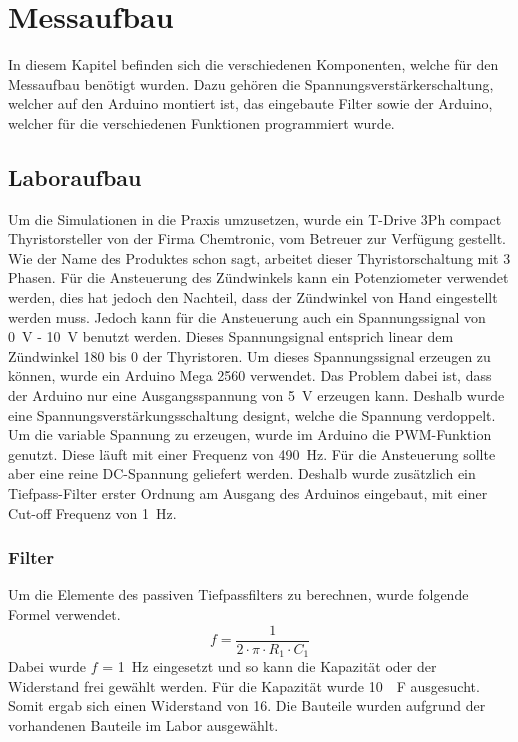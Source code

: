 \section{Messaufbau}
In diesem Kapitel befinden sich die verschiedenen Komponenten, welche für den Messaufbau benötigt wurden. Dazu gehören die Spannungsverstärkerschaltung, welcher auf den Arduino montiert ist, das eingebaute Filter sowie der Arduino, welcher für die verschiedenen Funktionen programmiert wurde.
\subsection{Laboraufbau}
Um die Simulationen in die Praxis umzusetzen, wurde ein \grqq T-Drive 3Ph compact Thyristorsteller\grqq \hspace{0.03cm} von der Firma Chemtronic, vom Betreuer zur Verfügung gestellt. Wie der Name des Produktes schon sagt, arbeitet dieser Thyristorschaltung mit 3 Phasen. Für die Ansteuerung des Zündwinkels kann ein Potenziometer verwendet werden, dies hat jedoch den Nachteil, dass der Zündwinkel von Hand eingestellt werden muss. Jedoch kann für die Ansteuerung auch ein Spannungssignal von \SI{0}{V} - \SI{10}{V} benutzt werden. Dieses Spannungsignal entsprich linear dem Zündwinkel 180\textdegree \hspace{0.02cm} bis 0\textdegree \hspace{0.02cm} der Thyristoren. Um dieses Spannungssignal erzeugen zu können, wurde ein Arduino Mega 2560 verwendet. Das Problem dabei ist, dass der Arduino nur eine Ausgangsspannung von \SI{5}{V} erzeugen kann. Deshalb wurde eine Spannungsverstärkungsschaltung designt, welche die Spannung verdoppelt. Um die variable Spannung zu erzeugen, wurde im Arduino die PWM-Funktion genutzt. Diese läuft mit einer Frequenz von \SI{490}{Hz}. Für die Ansteuerung sollte aber eine reine DC-Spannung geliefert werden. Deshalb wurde zusätzlich ein Tiefpass-Filter erster Ordnung am Ausgang des Arduinos eingebaut, mit einer Cut-off Frequenz von \SI{1}{Hz}.  


\subsubsection{Filter}
Um die Elemente des passiven Tiefpassfilters zu berechnen, wurde folgende Formel verwendet.
\begin{equation}
f = \frac{1}{2 \cdot \pi \cdot R_1 \cdot C_1}
\end{equation}
Dabei wurde $f$ = \SI{1}{Hz} eingesetzt und so kann die Kapazität oder der Widerstand frei gewählt werden. Für die Kapazität wurde \SI{10}{\mu F} ausgesucht. Somit ergab sich einen Widerstand von \SI{16}{\Omega}. Die Bauteile wurden aufgrund der vorhandenen Bauteile im Labor ausgewählt.



